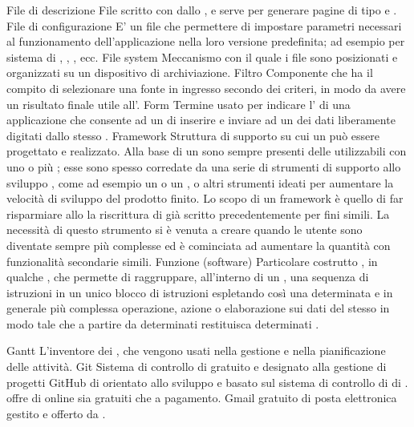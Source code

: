 \elemento
{File di descrizione}
{File scritto con   dallo , e serve per generare pagine di tipo e .}
\elemento
{File di configurazione}
{E' un file che permettere di impostare parametri necessari al funzionamento dell'applicazione nella loro versione predefinita; ad esempio  per sistema di , , , ecc.}
\elemento
{File system}
{Meccanismo con il quale i file sono posizionati e organizzati su un dispositivo di archiviazione.}
\elemento
{Filtro} 
{Componente che ha il compito di selezionare una fonte in ingresso secondo dei criteri, in modo da avere un risultato finale utile all'.}
\elemento
{Form}
{Termine usato per indicare l' di una applicazione che consente ad un  di inserire e inviare ad un  dei dati liberamente digitati dallo stesso .}
\elemento
{Framework}
{Struttura di supporto su cui un  può essere progettato e realizzato. Alla base di un  sono sempre presenti delle  utilizzabili con uno o più ; esse sono spesso corredate da una serie di strumenti di supporto allo sviluppo , come ad esempio un  o un , o altri strumenti ideati per aumentare la velocità di sviluppo del prodotto finito.
Lo scopo di un framework è quello di far risparmiare allo la riscrittura di  già scritto precedentemente per fini simili. La necessità di questo strumento si è venuta a creare quando le  utente sono diventate sempre più complesse ed è cominciata ad aumentare la quantità  con funzionalità secondarie simili.}
\elemento
{Funzione (software)}
{Particolare costrutto , in qualche , che permette di raggruppare, all'interno di un , una sequenza di istruzioni in un unico blocco di istruzioni espletando così una determinata e in generale più complessa operazione, azione o elaborazione sui dati del  stesso in modo tale che a partire da determinati  restituisca determinati .}

\elemento
{Gantt} 
{L'inventore dei , che vengono usati nella gestione e nella pianificazione delle attività.}
\elemento
{Git} 
{Sistema di controllo di  gratuito e  designato alla gestione di progetti }
\elemento
{GitHub} 
{ di  orientato allo sviluppo  e basato sul sistema di controllo di  di .  offre  di  online sia gratuiti che a pagamento.}
\elemento
{Gmail} 
{ gratuito di posta elettronica gestito e offerto da .}


